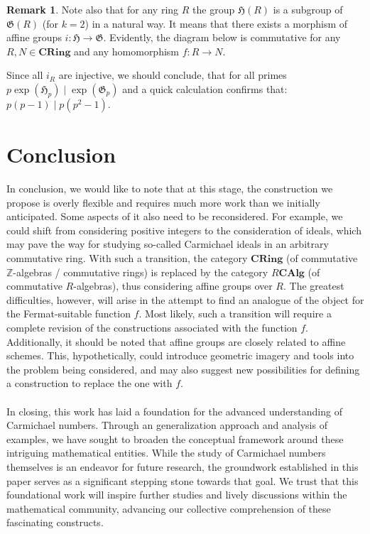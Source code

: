 \documentclass{article}
\theoremstyle{definition}
\theoremstyle{definition}
\newtheorem{remark}{Remark}[section]
\begin{document}
\begin{remark}
    Note also that for any ring $R$ the group $\mathfrak{H}(R)$ is a subgroup of $\mathfrak{G}(R)$ (for $k=2$) in a natural way. It means that there exists a morphism of affine groups $i:\mathfrak{H} \xrightarrow{} \mathfrak{G}$.
    Evidently, the diagram below is commutative for any $R,N \in \mathbf{CRing}$ and any homomorphism $f:R \xrightarrow{} N$. 
\begin{center}
\end{center}
Since all $i_R$ are injective, we should conclude, that for all primes $p\operatorname{exp}(\mathfrak{H}_p) \mid \operatorname{exp}(\mathfrak{G}_p)$ and a quick calculation confirms that: $p(p-1) \mid p(p^2-1).$
\end{remark}


\section{Conclusion}

In conclusion, we would like to note that at this stage, the construction we propose is overly flexible and requires much more work than we initially anticipated. Some aspects of it also need to be reconsidered. For example, we could shift from considering positive integers to the consideration of ideals, which may pave the way for studying so-called Carmichael ideals in an arbitrary commutative ring. With such a transition, the category $\mathbf{CRing}$ (of commutative
$\mathbb{Z}$-algebras / commutative rings) is replaced by the category $R$\makebox[0.5em][c]{-}$\mathbf{CAlg}$ (of commutative $R$-algebras), thus considering affine groups over $R.$ The greatest difficulties, however, will arise in the attempt to find an analogue of the object for the Fermat-suitable function $f$. Most likely, such a transition will require a complete revision of the constructions associated with the function 
$f$.\\
Additionally, it should be noted that affine groups are closely related to affine schemes. This, hypothetically, could introduce geometric imagery and tools into the problem being considered, and may also suggest new possibilities for defining a construction to replace the one with $f$.\\\\
In closing, this work has laid a foundation for the advanced understanding of Carmichael numbers. Through an generalization approach and analysis of examples, we have sought to broaden the conceptual framework around these intriguing mathematical entities. While the study of Carmichael numbers themselves is an endeavor for future research, the groundwork established in this paper serves as a significant stepping stone towards that goal. We trust that this foundational work will inspire further studies and lively discussions within the mathematical community, advancing our collective comprehension of these fascinating constructs.
\end{document}
